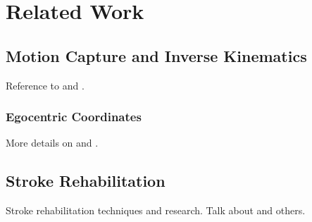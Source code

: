 
\chapter{Related Work} %

\label{Chapter2} %

\section{Motion Capture and Inverse Kinematics}

Reference to \cite{molla2013singularity} and \cite{molla2017egocentric}.

\subsection{Egocentric Coordinates}

More details on \cite{molla2017egocentric} and \cite{molla2016precise}.

\section{Stroke Rehabilitation}

Stroke rehabilitation techniques and research. Talk about \cite{flores2008improving} and others.
